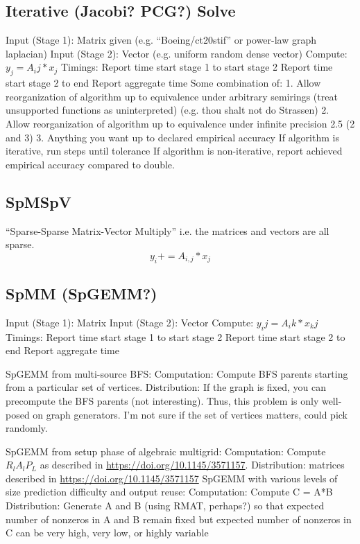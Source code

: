 \documentclass{article}
\begin{document}
\subsection{Iterative (Jacobi? PCG?) Solve}
	Input (Stage 1):
		Matrix given (e.g. “Boeing/ct20stif” or power-law graph laplacian)
	Input (Stage 2):
		Vector (e.g. uniform random dense vector)
	Compute:
		$y_j = A_ij * x_j$
	Timings:
Report time start stage 1 to start stage 2
Report time start stage 2 to end
Report aggregate time
Some combination of:
1. Allow reorganization of algorithm up to equivalence under arbitrary semirings (treat unsupported functions as uninterpreted) (e.g. thou shalt not do Strassen)
2. Allow reorganization of algorithm up to equivalence under infinite precision
2.5 (2 and 3)
3. Anything you want up to declared empirical accuracy
If algorithm is iterative, run steps until tolerance
If algorithm is non-iterative, report achieved empirical accuracy compared to double.

\subsection{SpMSpV}
``Sparse-Sparse Matrix-Vector Multiply'' i.e. the matrices and vectors are all sparse.
$$y_i += A_{i,j} * x_j$$

\subsection{SpMM (SpGEMM?)}
	Input (Stage 1):
		Matrix
	Input (Stage 2):
		Vector
	Compute:
		$y_ij = A_ik * x_kj$
	Timings:
Report time start stage 1 to start stage 2
Report time start stage 2 to end
Report aggregate time

SpGEMM from multi-source BFS:
	Computation: Compute BFS parents starting from a particular set of vertices.
	Distribution: If the graph is fixed, you can precompute the BFS parents (not interesting). Thus, this problem is only well-posed on graph generators. I’m not sure if the set of vertices matters, could pick randomly.

SpGEMM from setup phase of algebraic multigrid:
	Computation: Compute $R_lA_lP_L$ as described in \url{https://doi.org/10.1145/3571157}.
	Distribution: matrices described in \url{https://doi.org/10.1145/3571157}
SpGEMM with various levels of size prediction difficulty and output reuse:
	Computation: Compute C = A*B
	Distribution: Generate A and B (using RMAT, perhaps?) so that expected number of nonzeros in A and B remain fixed but expected number of nonzeros in C can be very high, very low, or highly variable
\end{document}
